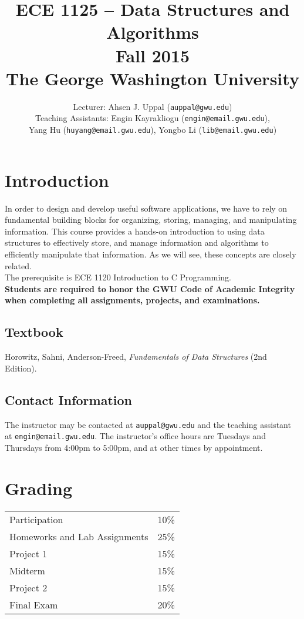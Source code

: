 \documentclass{article}
\title{ECE 1125 -- Data Structures and Algorithms \\ Fall 2015 \\ The George Washington University}
\author{Lecturer: Ahsen J. Uppal (\texttt{auppal@gwu.edu})
\\ Teaching Assistants: Engin Kayrakliogu (\texttt{engin@email.gwu.edu}), \\
Yang Hu (\texttt{huyang@email.gwu.edu}), Yongbo Li (\texttt{lib@email.gwu.edu})}
\date{}
\begin{document}
\maketitle

\section{Introduction}
In order to design and develop useful software applications, we have
to rely on fundamental building blocks for organizing, storing,
managing, and manipulating information. This course provides a
hands-on introduction to using data structures to effectively store,
and manage information and algorithms to efficiently manipulate that
information. As we will see, these concepts are closely related.
\\

The prerequisite is ECE 1120 Introduction to C Programming.
\\

\noindent
\textbf{Students are required to honor the GWU Code of Academic Integrity when completing all assignments, projects, and examinations.}

\subsection{Textbook}
Horowitz, Sahni, Anderson-Freed, \textit{Fundamentals of Data Structures} (2nd Edition).

\subsection{Contact Information}
The instructor may be contacted at \texttt{auppal@gwu.edu} and the
teaching assistant at \texttt{engin@email.gwu.edu}. The instructor's
office hours are Tuesdays and Thursdays from 4:00pm to 5:00pm, and
at other times by appointment.


\section{Grading}
\begin{center}
\begin{tabular}{|l|l|}
\hline
Participation & 10\% \\
Homeworks and Lab Assignments & 25\% \\
Project 1 &     15\% \\
Midterm   &     15\% \\
Project 2 &     15\% \\
Final Exam &    20\% \\
\hline
\end{tabular}
\end{center}
\end{document}
